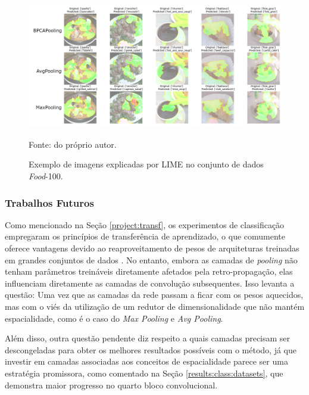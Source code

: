 \begin{figure}[H]
    \centering
    \caption{Exemplo de imagens explicadas por LIME no conjunto de dados \textit{Food}-100.}
    \label{results:fig:datasets:9}
    \includegraphics[width=1\textwidth]{recursos/imagens/results/lime_explanations_food.png}

    Fonte: do próprio autor.
\end{figure}


\subsubsection{Trabalhos Futuros}
\label{results:class:future}
Como mencionado na Seção \ref{project:transf}, os experimentos de classificação empregaram os princípios de transferência de aprendizado, o que comumente oferece vantagens devido ao reaproveitamento de pesos de arquiteturas treinadas em grandes conjuntos de dados \citep{Pan2010}. No entanto, embora as camadas de \textit{pooling} não tenham parâmetros treináveis diretamente afetados pela retro-propagação, elas influenciam diretamente as camadas de convolução subsequentes. Isso levanta a questão:  Uma vez que as camadas da rede passam a ficar com os pesos aquecidos, mas com o viés da utilização de um redutor de dimensionalidade que não mantém espacialidade, como é o caso do \textit{Max Pooling} e \textit{Avg Pooling}.

Além disso, outra questão pendente diz respeito a quais camadas precisam ser descongeladas para obter os melhores resultados possíveis com o método, já que investir em camadas associadas aos conceitos de espacialidade parece ser uma estratégia promissora, como comentado na Seção \ref{results:class:datasets}, que demonstra maior progresso no quarto bloco convolucional.

